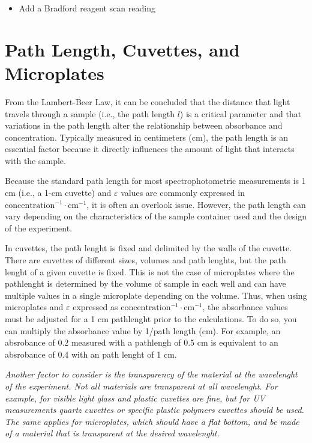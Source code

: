 \documentclass[
  9pt,
  american,
  a5paper,
  extrafontsizes,onecolumn,openright
  ]{memoir}
\providecommand{\tightlist}{%
  \setlength{\itemsep}{0pt}\setlength{\parskip}{0pt}}
\begin{document}
\begin{itemize}
\tightlist
\item
  Add a Bradford reagent scan reading
\end{itemize}

\section{Path Length, Cuvettes, and Microplates}\label{path-length-cuvettes-and-microplates}

From the Lambert-Beer Law, it can be concluded that the distance that light travels through a sample (i.e., the path length \(l\)) is a critical parameter and that variations in the path length alter the relationship between absorbance and concentration. Typically measured in centimeters (cm), the path length is an essential factor because it directly influences the amount of light that interacts with the sample.

Because the standard path length for most spectrophotometric measurements is 1 cm (i.e., a 1-cm cuvette) and \(\varepsilon\) values are commonly expressed in \(\text{concentration}^{-1} \cdot \text{cm}^{-1}\), it is often an overlook issue. However, the path length can vary depending on the characteristics of the sample container used and the design of the experiment.

In cuvettes, the path lenght is fixed and delimited by the walls of the cuvette. There are cuvettes of different sizes, volumes and path lenghts, but the path lenght of a given cuvette is fixed. This is not the case of microplates where the pathlenght is determined by the volume of sample in each well and can have multiple values in a single microplate depending on the volume. Thus, when using microplates and \(\varepsilon\) expressed as \(\text{concentration}^{-1} \cdot \text{cm}^{-1}\), the absorbance values must be adjusted for a 1 cm pathlenght prior to the calculations. To do so, you can multiply the absorbance value by 1/path length (cm). For example, an absrobance of 0.2 measured with a pathlengh of 0.5 cm is equivalent to an absrobance of 0.4 with an path lenght of 1 cm.

\begin{greybox}[frametitle = Note]
\emph{Another factor to consider is the transparency of the material at the wavelenght of the experiment. Not all materials are transparent at all wavelenght. For example, for visible light glass and plastic cuvettes are fine, but for UV measurements quartz cuvettes or specific plastic polymers cuvettes should be used. The same applies for microplates, which should have a flat bottom, and be made of a material that is transparent at the desired wavelenght.}

\end{greybox}
\end{document}

